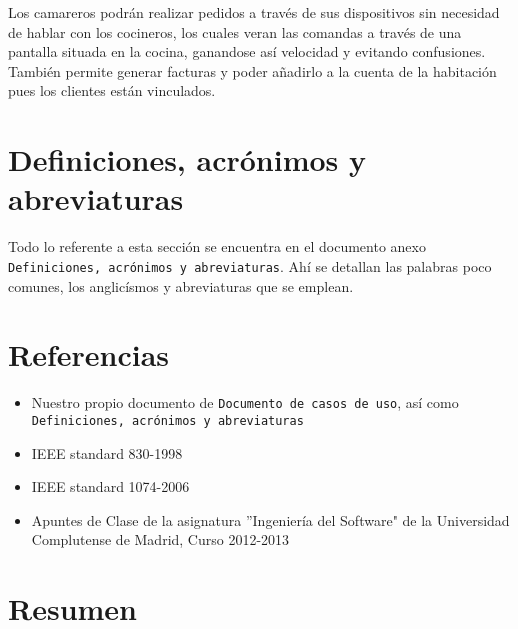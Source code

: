 \documentclass[spanish,a4paper,12pt]{report}	%
\begin{document}
Los camareros podrán realizar pedidos a través de sus dispositivos sin necesidad de hablar con los cocineros, los cuales veran las comandas a través de una pantalla situada en la cocina, ganandose así velocidad y evitando confusiones. También permite generar facturas y poder añadirlo a la cuenta de la habitación pues los clientes están vinculados.


\section{Definiciones, acrónimos y abreviaturas}

Todo lo referente a esta sección se encuentra en el documento anexo \texttt{Definiciones, acrónimos y abreviaturas}. Ahí se detallan las palabras poco comunes, los anglicísmos y abreviaturas que se emplean.

\section{Referencias}
	\begin{itemize}
		\item Nuestro propio documento de \texttt{Documento de casos de uso}, así como \\ \texttt{Definiciones, acrónimos y abreviaturas}
		\item  IEEE standard 830-1998
		\item IEEE standard 1074-2006
		\item Apuntes de Clase de la asignatura ''Ingeniería del Software" de la Universidad Complutense de Madrid, Curso 2012-2013

	\end{itemize}

\section{Resumen}
\end{document}
